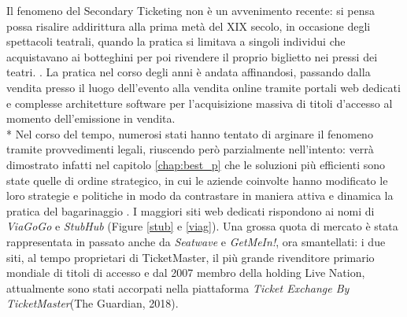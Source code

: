 Il fenomeno del Secondary Ticketing non è un avvenimento recente: si pensa possa risalire addirittura alla prima metà del XIX secolo, in occasione degli spettacoli teatrali, quando la pratica si limitava a singoli individui che acquistavano ai botteghini per poi rivendere il proprio biglietto nei pressi dei teatri. \cite{elefant2018beyond}. La pratica nel corso degli anni è andata affinandosi, passando dalla vendita presso il luogo dell'evento alla vendita online tramite portali web dedicati e complesse architetture software per l'acquisizione massiva di titoli d'accesso al momento dell'emissione in vendita. \\*
Nel corso del tempo, numerosi stati hanno tentato di arginare il fenomeno tramite provvedimenti legali, riuscendo però parzialmente nell'intento: verrà dimostrato infatti nel capitolo \ref{chap:best_p} che le soluzioni più efficienti sono state quelle di ordine strategico, in cui le aziende coinvolte hanno modificato le loro strategie e politiche in modo da contrastare in maniera attiva e dinamica la pratica del bagarinaggio \cite{drayer2011examining}. 
I maggiori siti web dedicati rispondono ai nomi di \textit{ViaGoGo} e \textit{StubHub} (Figure \ref{stub} e \ref{viag}). Una grossa quota di mercato è stata rappresentata in passato anche da \textit{Seatwave} e \textit{GetMeIn!}, ora smantellati: i due siti, al tempo proprietari di TicketMaster, il più grande rivenditore primario mondiale di titoli di accesso e dal 2007 membro della holding Live Nation, attualmente sono stati accorpati nella piattaforma \textit{Ticket Exchange By TicketMaster}(The Guardian, 2018).
